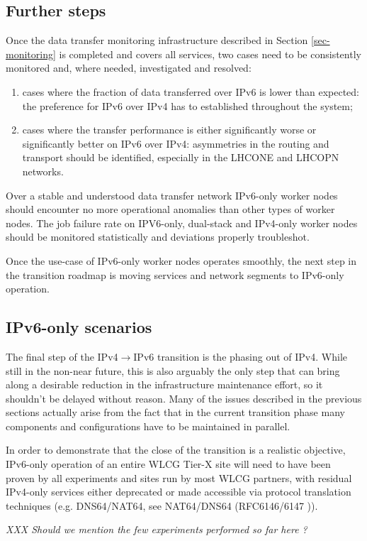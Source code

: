\subsection{Further steps}
Once the data transfer monitoring infrastructure described in Section
\ref{sec-monitoring} is completed and covers all services, two cases
need to be consistently monitored and, where needed, investigated
and resolved:
\begin{enumerate}
\item cases where the fraction of data transferred over IPv6 is lower than expected:
the preference for IPv6 over IPv4 has to established throughout the system;
\item cases where the transfer performance is either significantly worse 
or significantly better on IPv6 over IPv4: asymmetries in the routing and
transport should be identified, especially in the LHCONE and LHCOPN networks.
\end{enumerate}
\par
Over a stable and understood data transfer network 
IPv6-only worker nodes should encounter no more operational anomalies
than other types of worker nodes. The 
job failure rate on IPV6-only, dual-stack and IPv4-only worker nodes should
be monitored statistically and deviations properly troubleshot.
\par
Once the use-case of IPv6-only worker nodes operates smoothly, the next
step in the transition roadmap is moving services and network segments to
IPv6-only operation.

\subsection{IPv6-only scenarios}
The final step of the IPv4$\rightarrow$IPv6 transition is the phasing out of
IPv4. While still in the non-near future, this is also arguably the only step
that can bring along a desirable reduction
in the infrastructure maintenance effort, so it shouldn't be delayed
without reason. Many of the issues described in the previous sections 
actually arise
from the fact that in the current transition phase many components and
configurations have to be maintained in parallel.
\par
In order to demonstrate that the close of the transition is a realistic
objective, IPv6-only operation of an entire WLCG Tier-X site will
need to have been proven by all experiments and sites run by most WLCG
partners, with residual IPv4-only services either deprecated or made
accessible via protocol translation techniques (e.g. DNS64/NAT64, see
NAT64/DNS64 (RFC6146/6147 \cite{rfc})). 
\par
{\it XXX Should we mention the few experiments performed so far here ?}

